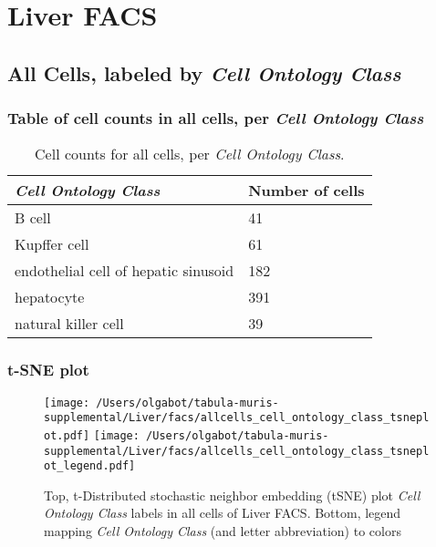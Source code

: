 \clearpage
\section{Liver FACS}

\subsection{All Cells, labeled by \emph{Cell Ontology Class}}
\subsubsection{Table of cell counts in all cells, per \emph{Cell Ontology Class}}\begin{table}[h]
\centering
\label{my-label}
\begin{tabular}{@{}ll@{}}
\toprule

\emph{Cell Ontology Class}& Number of cells \\ \midrule
B cell & 41 \\

Kupffer cell & 61 \\

endothelial cell of hepatic sinusoid & 182 \\

hepatocyte & 391 \\

natural killer cell & 39 \\
\bottomrule
\end{tabular}
\caption{Cell counts for all cells, per \emph{Cell Ontology Class}.}
\end{table}

\clearpage
\subsubsection{t-SNE plot}
\begin{figure}[h]
\centering
\texttt{[image: /Users/olgabot/tabula-muris-supplemental/Liver/facs/allcells\_cell\_ontology\_class\_tsneplot.pdf]}
\texttt{[image: /Users/olgabot/tabula-muris-supplemental/Liver/facs/allcells\_cell\_ontology\_class\_tsneplot\_legend.pdf]}
\caption{Top, t-Distributed stochastic neighbor embedding (tSNE) plot  \emph{Cell Ontology Class} labels in all cells of Liver FACS. Bottom, legend mapping \emph{Cell Ontology Class} (and letter abbreviation) to colors}
\end{figure}


\clearpage

